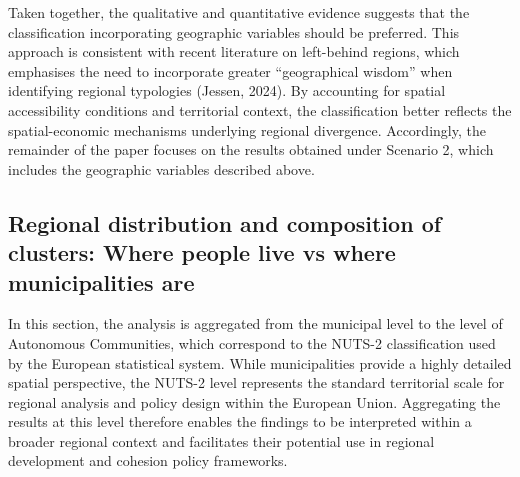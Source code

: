 \documentclass[a4paper,11pt,oneside]{article}
\begin{document}
Taken together, the qualitative and quantitative evidence suggests that the classification incorporating geographic variables should be preferred. This approach is consistent with recent literature on left-behind regions, which emphasises the need to incorporate greater “geographical wisdom” when identifying regional typologies {\color{red} (Jessen, 2024)}. By accounting for spatial accessibility conditions and territorial context, the classification better reflects the spatial-economic mechanisms underlying regional divergence. Accordingly, the remainder of the paper focuses on the results obtained under Scenario 2, which includes the geographic variables described above.








\subsection{Regional distribution and composition of clusters: Where people live vs where municipalities are}

In this section, the analysis is aggregated from the municipal level to the level of Autonomous Communities, which correspond to the NUTS-2 classification used by the European statistical system. While municipalities provide a highly detailed spatial perspective, the NUTS-2 level represents the standard territorial scale for regional analysis and policy design within the European Union. Aggregating the results at this level therefore enables the findings to be interpreted within a broader regional context and facilitates their potential use in regional development and cohesion policy frameworks.
\end{document}
